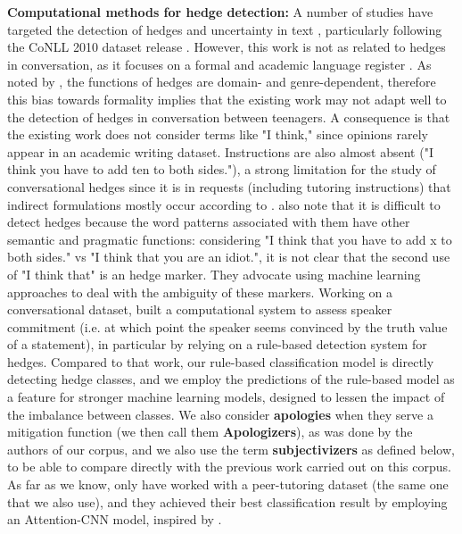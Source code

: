 \documentclass[11pt]{article}
\begin{document}
\noindent\textbf{Computational methods for hedge detection:} 
A number of studies have targeted the detection of hedges and uncertainty in text \citep{Medlock2007, Ganter2009, Tang2010, Velldal2011, Szarvas2012}, particularly following the CoNLL 2010 dataset release \cite{Farkas2010}. However, this work is not as related to hedges in conversation, as it focuses on a formal and academic language register \citep{Hyland1998, Varttala1999}. As noted by \citet{Prokofieva2014}, the functions of hedges are domain- and genre-dependent, therefore this bias towards formality implies that the existing work may not adapt well to the detection of hedges in conversation between teenagers. A consequence is that the existing work does not consider terms like "I think," since opinions rarely appear in an academic writing dataset. Instructions are also almost absent ("I think you have to add ten to both sides."), a strong limitation for the study of conversational hedges since it is in requests (including tutoring instructions) that indirect formulations mostly occur according to \citet{Blum1987}. 
\citet{Prokofieva2014} also note that it is difficult to detect hedges because the word patterns associated with them have other semantic and pragmatic functions: considering "I think that you have to add x to both sides." vs "I think that you are an idiot.", it is not clear that the second use of "I think that" is an hedge marker. They advocate using machine learning approaches to deal with the ambiguity of these markers.
Working on a conversational dataset, \citet{Ulinski2018} built a computational system to assess speaker commitment (i.e. at which point the speaker seems convinced by the truth value of a statement), in particular by relying on a rule-based detection system for hedges.
\noindent Compared to that work, our rule-based classification model is directly detecting hedge classes, and we employ the predictions of the rule-based model as a feature for stronger machine learning models, designed to lessen the impact of the imbalance between classes. We also consider \textbf{apologies} when they serve a mitigation function (we then call them \textbf{Apologizers}), as was done by the authors of our corpus, and we also use the term \textbf{subjectivizers} as defined below, to be able to compare directly with the previous work carried out on this corpus. 
As far as we know, only \citet{Goel2019} have worked with a peer-tutoring dataset (the same one that we also use), and they achieved their best classification result by employing an Attention-CNN model, inspired by \citet{Adel2017}. 
\end{document}
